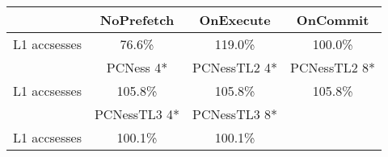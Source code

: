 \begin{tabular}{ l|ccc }
 & NoPrefetch & OnExecute & OnCommit\\ \hline
L1 accsesses & 76.6\% & 119.0\% & 100.0\%\\ \hline
\hline
 & PCNess 4* & PCNessTL2 4* & PCNessTL2 8*\\ \hline
L1 accsesses & 105.8\% & 105.8\% & 105.8\%\\ \hline
\hline
 & PCNessTL3 4* & PCNessTL3 8*&\\ \hline
L1 accsesses & 100.1\% & 100.1\%&\\ \hline
\end{tabular}

